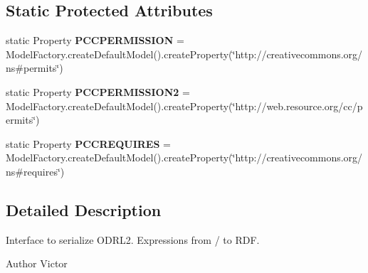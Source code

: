 \subsection*{Static Protected Attributes}
\begin{DoxyCompactItemize}
\item 
\hypertarget{classodrlmodel_1_1_o_d_r_l_r_d_f_a10e793181613efb878443482aa2fa43a}{static Property {\bfseries P\-C\-C\-P\-E\-R\-M\-I\-S\-S\-I\-O\-N} = Model\-Factory.\-create\-Default\-Model().create\-Property(\char`\"{}http\-://creativecommons.\-org/ns\#permits\char`\"{})}\label{classodrlmodel_1_1_o_d_r_l_r_d_f_a10e793181613efb878443482aa2fa43a}

\item 
\hypertarget{classodrlmodel_1_1_o_d_r_l_r_d_f_a94861aae27fa210b649b52547dd4ce05}{static Property {\bfseries P\-C\-C\-P\-E\-R\-M\-I\-S\-S\-I\-O\-N2} = Model\-Factory.\-create\-Default\-Model().create\-Property(\char`\"{}http\-://web.\-resource.\-org/cc/permits\char`\"{})}\label{classodrlmodel_1_1_o_d_r_l_r_d_f_a94861aae27fa210b649b52547dd4ce05}

\item 
\hypertarget{classodrlmodel_1_1_o_d_r_l_r_d_f_a1057082ecc87b0162c071ef8dbcbcf48}{static Property {\bfseries P\-C\-C\-R\-E\-Q\-U\-I\-R\-E\-S} = Model\-Factory.\-create\-Default\-Model().create\-Property(\char`\"{}http\-://creativecommons.\-org/ns\#requires\char`\"{})}\label{classodrlmodel_1_1_o_d_r_l_r_d_f_a1057082ecc87b0162c071ef8dbcbcf48}

\end{DoxyCompactItemize}


\subsection{Detailed Description}
Interface to serialize O\-D\-R\-L2. Expressions from / to R\-D\-F.

\begin{DoxyAuthor}{Author}
Victor 
\end{DoxyAuthor}


